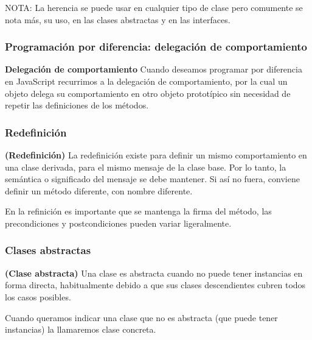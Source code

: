 \documentclass[../main.tex]{subfiles}
\begin{document}
            NOTA: La herencia se puede usar en cualquier tipo de clase pero comumente se nota más, su uso, en las clases abstractas y en las interfaces.\\

        \subsubsection{Programación por diferencia: delegación de comportamiento}
            \begin{definition} \textbf{Delegación de comportamiento}
                Cuando deseamos programar por diferencia en JavaScript recurrimos a la delegación de comportamiento, por la cual un objeto delega su comportamiento en otro objeto prototípico sin necesidad de repetir las definiciones de los métodos.
            \end{definition}
        
        \subsubsection{Redefinición}
            \begin{definition} \textbf{(Redefinición)}
                La redefinición existe para definir un mismo comportamiento en una clase derivada, para el mismo mensaje de la clase base. Por lo tanto, la semántica o significado del mensaje se debe mantener. Si así no fuera, conviene definir un método diferente, con nombre diferente.
            \end{definition}

            En la refinición es importante que se mantenga la firma del método, las precondiciones y postcondiciones pueden variar ligeralmente.
        
        \subsubsection{Clases abstractas}
            \begin{definition} \textbf{(Clase abstracta)}
                Una clase es abstracta cuando no puede tener instancias en forma directa, habitualmente debido a que sus clases descendientes cubren todos los casos posibles.
                
                Cuando queramos indicar una clase que no es abstracta (que puede tener instancias) la llamaremos clase concreta.          
            \end{definition}
\end{document}
